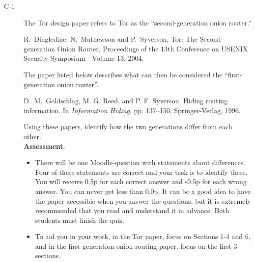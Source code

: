 \documentclass{article}
\begin{document}
\begin{description}
	\item[C-1]{The Tor design paper refers to Tor as the ``second-generation onion router.'' 
		\begin{center}
			\begin{minipage}{0.8\textwidth}
				R.~Dingledine, N.~Mathewson and P.~Syverson, Tor: The Second-generation Onion Router, Proceedings of the 13th Conference on USENIX Security Symposium - Volume 13, 2004.
			\end{minipage}
		\end{center}
		The paper listed below describes what can then be considered the ``first-generation onion router''.
		\begin{center}
			\begin{minipage}{0.8\textwidth}
				D.~M.~Goldschlag, M. G. Reed, and P. F. Syverson. Hiding routing information. In \textit{Information Hiding}, pp. 137--150, Springer-Verlag, 1996.
			\end{minipage}
		\end{center}
		Using these papers, identify how the two generations differ from each other.\\
		\textbf{Assessment}:
		\begin{itemize}
			\item There will be one Moodle-question with statements about differences. Four of these statements are correct and your task is to identify these. You will receive 0.5p for each correct answer and -0.5p for each wrong answer. You can never get less than 0.0p. It can be a good idea to have the paper accessible when you answer the questions, but it is extremely recommended that you read and understand it in advance. Both students must finish the quiz.
			\item To aid you in your work, in the Tor paper, focus on Sections 1-4 and 6, and in the first generation onion routing paper, focus on the first 3 sections. 
		\end{itemize}
	}

\end{description}
\end{document}
